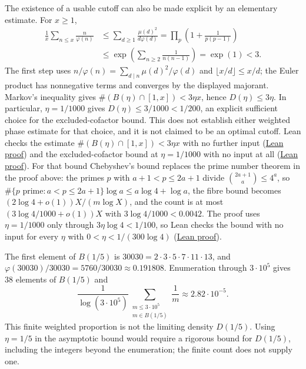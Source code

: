 \documentclass[11pt]{article}
\theoremstyle{plain}
\theoremstyle{definition}
\theoremstyle{remark}
\providecommand{\m}[1]{\ensuremath{#1}}
\begin{document}
\noindent
The existence of a usable cutoff can also be made explicit by an
elementary estimate. For $x\ge1$,
\[
\begin{aligned}
 \frac1x\sum_{n\le x}\frac n{\varphi(n)}
 &\le\sum_{d\ge1}\frac{\mu(d)^2}{d\varphi(d)}
   =\prod_p\left(1+\frac1{p(p-1)}\right)\\
 &\le\exp\left(\sum_{n\ge2}\frac1{n(n-1)}\right)
   =\exp(1)<3.
\end{aligned}
\]
The first step uses
$n/\varphi(n)=\sum_{d\mid n}\mu(d)^2/\varphi(d)$ and
$\lfloor x/d\rfloor\le x/d$; the Euler product has nonnegative terms
and converges by the displayed majorant. Markov's inequality gives
$\#(B(\eta)\cap[1,x])<3\eta x$, hence $D(\eta)\le3\eta$.
In particular, $\eta=1/1000$ gives
$D(\eta)\le3/1000<1/200$, an explicit sufficient choice for the
excluded-cofactor bound. This does not establish either weighted phase
estimate for that choice, and it is not claimed to be an optimal cutoff.
Lean checks the estimate $\#(B(\eta)\cap[1,x])<3\eta x$ with no further input
(\href{https://github.com/wcook04/plectis-erdos/blob/76f44c5329c0e207f5376062c7d79125485fbceb/lean/ErdosProblems/Erdos249/PaperCompleteR21/ExcludedCofactorDensity.lean\#L361}{Lean proof})
and the excluded-cofactor bound at $\eta=1/1000$ with no input at all
(\href{https://github.com/wcook04/plectis-erdos/blob/57941a741fceaae33ab7e2513a9cd11fee060081/lean/ErdosProblems/Erdos249/PaperCompleteR21/ExcludedCofactorEstimate.lean\#L910}{Lean proof}).
For that bound Chebyshev's bound replaces the prime number theorem in the
proof above: the primes $p$ with $a+1<p\le2a+1$ divide
$\binom{2a+1}{a}\le4^a$, so
$\#\{p\text{ prime}:a<p\le2a+1\}\log a\le a\log4+\log a$, the fibre bound
becomes $(2\log4+o(1))X/(m\log X)$, and the count is at most
$(3\log4/1000+o(1))X$ with $3\log4/1000<0.0042$.
The proof uses $\eta=1/1000$ only through $3\eta\log4<1/100$, so Lean checks
the bound with no input for every $\eta$ with $0<\eta<1/(300\log4)$
(\href{https://github.com/wcook04/plectis-erdos/blob/ab690b0aa515faa3a432e9d47de288704ebf6bb5/lean/ErdosProblems/Erdos249/PaperCompleteR21/ExcludedCofactorEstimate.lean\#L930}{Lean proof}).

The first element of $B(1/5)$ is
$30030=2\cdot3\cdot5\cdot7\cdot11\cdot13$, and
$\varphi(30030)/30030=5760/30030\approx0.191808$. Enumeration through
$3\cdot10^5$ gives $38$ elements of $B(1/5)$ and
\[
 \frac{1}{\log(3\cdot10^5)}
 \sum_{\substack{m\le3\cdot10^5\\m\in B(1/5)}}\frac1m
 \approx2.82\cdot10^{-5}.
\]
This finite weighted proportion is not the limiting density $D(1/5)$.
Using $\eta=1/5$ in the asymptotic bound would require a
rigorous bound for $D(1/5)$, including the integers beyond the enumeration;
the finite count does not supply one.
\end{document}

